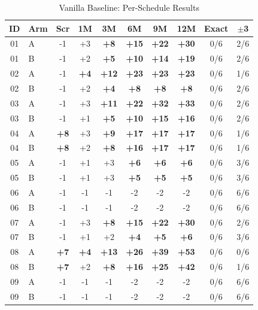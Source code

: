 \begin{table}[htbp]
\centering
\caption{Vanilla Baseline: Per-Schedule Results}
\label{tab:vanilla_baseline_detailed}
\small
\begin{tabular}{clcccccccc}
\toprule
\textbf{ID} & \textbf{Arm} & \textbf{Scr} & \textbf{1M} & \textbf{3M} & \textbf{6M} & \textbf{9M} & \textbf{12M} & \textbf{Exact} & \textbf{$\pm$3} \\
\midrule
01 & A & -1 & +3 & \textbf{+8} & \textbf{+15} & \textbf{+22} & \textbf{+30} & 0/6 & 2/6 \\
01 & B & -1 & +2 & \textbf{+5} & \textbf{+10} & \textbf{+14} & \textbf{+19} & 0/6 & 2/6 \\
02 & A & -1 & \textbf{+4} & \textbf{+12} & \textbf{+23} & \textbf{+23} & \textbf{+23} & 0/6 & 1/6 \\
02 & B & -1 & +2 & \textbf{+4} & \textbf{+8} & \textbf{+8} & \textbf{+8} & 0/6 & 2/6 \\
03 & A & -1 & +3 & \textbf{+11} & \textbf{+22} & \textbf{+32} & \textbf{+33} & 0/6 & 2/6 \\
03 & B & -1 & +1 & \textbf{+5} & \textbf{+10} & \textbf{+15} & \textbf{+16} & 0/6 & 2/6 \\
04 & A & \textbf{+8} & +3 & \textbf{+9} & \textbf{+17} & \textbf{+17} & \textbf{+17} & 0/6 & 1/6 \\
04 & B & \textbf{+8} & +2 & \textbf{+8} & \textbf{+16} & \textbf{+17} & \textbf{+17} & 0/6 & 1/6 \\
05 & A & -1 & +1 & +3 & \textbf{+6} & \textbf{+6} & \textbf{+6} & 0/6 & 3/6 \\
05 & B & -1 & +1 & +3 & \textbf{+5} & \textbf{+5} & \textbf{+5} & 0/6 & 3/6 \\
06 & A & -1 & -1 & -1 & -2 & -2 & -2 & 0/6 & 6/6 \\
06 & B & -1 & -1 & -1 & -2 & -2 & -2 & 0/6 & 6/6 \\
07 & A & -1 & +3 & \textbf{+8} & \textbf{+15} & \textbf{+22} & \textbf{+30} & 0/6 & 2/6 \\
07 & B & -1 & +1 & +2 & \textbf{+4} & \textbf{+5} & \textbf{+6} & 0/6 & 3/6 \\
08 & A & \textbf{+7} & \textbf{+4} & \textbf{+13} & \textbf{+26} & \textbf{+39} & \textbf{+53} & 0/6 & 0/6 \\
08 & B & \textbf{+7} & +2 & \textbf{+8} & \textbf{+16} & \textbf{+25} & \textbf{+42} & 0/6 & 1/6 \\
09 & A & -1 & -1 & -1 & -2 & -2 & -2 & 0/6 & 6/6 \\
09 & B & -1 & -1 & -1 & -2 & -2 & -2 & 0/6 & 6/6 \\

\end{tabular}
\end{table}
